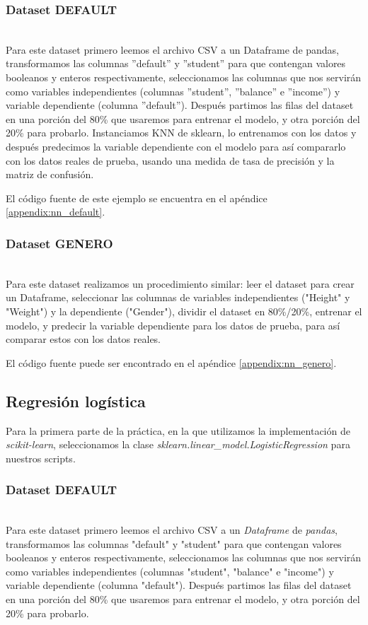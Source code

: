\documentclass[sigconf,authorversion,nonacm]{acmart}
\begin{document}
\subsubsection{Dataset DEFAULT}\hfill\\
Para este dataset primero leemos el archivo CSV a un Dataframe de pandas, transformamos las columnas ”default” y ”student” para que contengan valores booleanos y enteros respectivamente, seleccionamos las columnas que nos servirán como variables independientes (columnas ”student”, ”balance” e ”income”) y variable dependiente (columna ”default”). Después partimos las filas del dataset en una porción del 80\% que usaremos para entrenar el modelo, y otra porción del 20\% para probarlo.
Instanciamos KNN de sklearn, lo entrenamos con los datos y después predecimos la variable dependiente con el modelo para así compararlo con los datos reales de prueba, usando una medida de tasa de precisión y la matriz de confusión.

El código fuente de este ejemplo se encuentra en el apéndice \ref{appendix:nn_default}.

\subsubsection{Dataset GENERO}\hfill\\
Para este dataset realizamos un procedimiento similar: leer el dataset
para crear un Dataframe, seleccionar las columnas de variables independientes ("Height" y "Weight") y la dependiente ("Gender"), dividir el dataset en 80\%/20\%, entrenar el modelo, y predecir la variable dependiente para los datos de prueba, para así comparar estos con los datos reales.

El código fuente puede ser encontrado en el apéndice \ref{appendix:nn_genero}.

\subsection{Regresión logística}
Para la primera parte de la práctica, en la que utilizamos la implementación de \textit{scikit-learn}, seleccionamos la clase \newline\textit{sklearn.linear\_model.LogisticRegression}\cite{scikit-learn} para nuestros scripts.


\subsubsection{Dataset DEFAULT}\hfill\\
Para este dataset primero leemos el archivo CSV a un \textit{Dataframe} de \textit{pandas}, transformamos las columnas "default" y "student" para que contengan valores booleanos y enteros respectivamente, seleccionamos las columnas que nos servirán como variables independientes (columnas "student", "balance" e "income") y variable dependiente (columna "default"). Después partimos las filas del dataset en una porción del 80\% que usaremos para entrenar el modelo, y otra porción del 20\% para probarlo.
\end{document}
